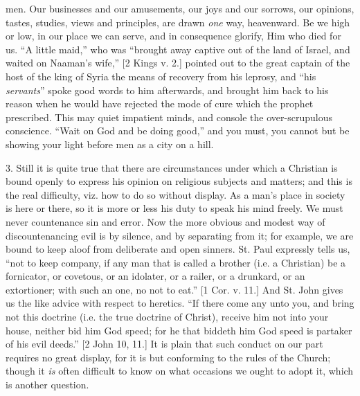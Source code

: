 men. Our businesses and our amusements, our joys and our
sorrows, our opinions, tastes, studies, views and
principles, are drawn \emph{one} way, heavenward. Be we
high or low, in our place we can serve, and in
consequence glorify, Him who died for us. ``A little
maid,'' who was ``brought away captive out of the
land of Israel, and waited on Naaman's wife,'' [2
Kings v. 2.] pointed out to the great captain of the host
of the king of Syria the means of recovery from his
leprosy, and ``his \emph{servants}'' spoke good
words to him afterwards, and brought him back to his
reason when he would have rejected the mode of cure which
the prophet prescribed. This may quiet impatient minds, and console the over-scrupulous conscience. ``Wait on
God and be doing good,'' and you must, you cannot but
be showing your light before men as a city on a hill.

3. Still it is quite true that there are circumstances
under which a Christian is bound openly to express his
opinion on religious subjects and matters; and this is
the real difficulty, viz. how to do so without display.
As a man's place in society is here or there, so it is
more or less his duty to speak his mind freely. We must
never countenance sin and error. Now the more obvious and
modest way of discountenancing evil is by silence, and by
separating from it; for example, we are bound to keep
aloof from deliberate and open sinners. St. Paul
expressly tells us, ``not to keep company, if any man
that is called a brother (i.e. a Christian) be a
fornicator, or covetous, or an idolater, or a railer, or
a drunkard, or an extortioner; with such an one, no not
to eat.'' [1 Cor. v. 11.] And St. John gives us the
like advice with respect to heretics. ``If there come
any unto you, and bring not this doctrine (i.e. the true
doctrine of Christ), receive him not into your house,
neither bid him God speed; for he that biddeth him God
speed is partaker of his evil deeds.'' [2 John 10,
11.] It is plain that such conduct on our part requires
no great display, for it is but conforming to the rules
of the Church; though it \emph{is} often difficult to
know on what occasions we ought to adopt it, which is
another question.

